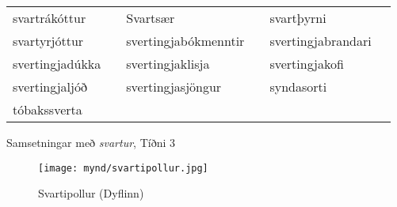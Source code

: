 \documentclass[../samsetningasafn.tex]{subfiles}
\begin{document}
\begin{wordlist}[H]
\begin{tcolorbox}
\begin{tabular}{BlBlBl}
		svartrákóttur 	& 		& 
		Svartsær		& 		& 
		svartþyrni 	& 		\\	 	
		svartyrjóttur 	& 		& 
		svertingjabókmenntir  & 	& 
		svertingjabrandari	& 		\\ 
		svertingjadúkka	& 	& 
		svertingjaklisja		& 		& 
		svertingjakofi		& 	\\ 	
		svertingjaljóð		& 	& 	
		svertingjasjöngur	& 		& 
		syndasorti 		& 		\\ 	
		tóbakssverta 		& 		& 
						& 		&
						&
\end{tabular}
\end{tcolorbox}
	\caption{Samsetningar með \textit{svartur}, Tíðni 3}
	\label{listi:svart.3}
\end{wordlist}

\begin{figure}[H]
\begin{tcolorbox}
\centering
	\texttt{[image: mynd/svartipollur.jpg]}
\end{tcolorbox}
	\caption{Svartipollur (Dyflinn)}
	\label{mynd:svartipollur}
\end{figure}
		
\end{document}

